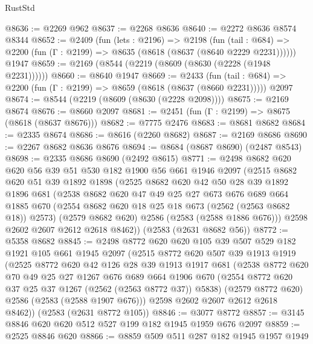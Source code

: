 \begin{lexlean}{RustStd}
\begin{coremodule}
{\begin{coremodule}
{{{{{{{{{{{{{{{@8636 := @2269 @962
@8637 := @2268 @8636
@8640 := @2272 @8636 @8574 @8344
@8652 := @2409
    (fun (lets : @2196) =>
    @2198
      (fun (tail : @684) => @2200 (fun (Γ : @2199) => @8635 (@8618 (@8637 (@8640 @2229 @2231))))))
    @1947
@8659 := @2169 (@8544 (@2219 (@8609 (@8630 (@2228 (@1948 @2231))))))
@8660 := @8640 @1947
@8669 := @2433
    (fun (tail : @684) => @2200 (fun (Γ : @2199) => @8659 (@8618 (@8637 (@8660 @2231)))))
    @2097
@8674 := @8544 (@2219 (@8609 (@8630 (@2228 @2098))))
@8675 := @2169 @8674
@8676 := @8660 @2097
@8681 := @2451 (fun (Γ : @2199) => @8675 (@8618 (@8637 @8676)))
@8682 := @7775 @2476
@8683 := @8681 @8682
@8684 := @2335 @8674
@8686 := @8616 (@2260 @8682)
@8687 := @2169 @8686
@8690 := @2267 @8682 @8636 @8676
@8694 := @8684 (@8687 @8690) (@2487 @8543)
@8698 := @2335 @8686 @8690 (@2492 @8615)
@8771 := @2498
    @8682
    @620
    @620
    @56
    @39
    @51
    @530
    @182
    @1900
    @56
    @661
    @1946
    @2097
    (@2515
      @8682
      @620
      @51
      @39
      @1892
      @1898
      (@2525
        @8682
        @620
        @42
        @50
        @28
        @39
        @1892
        @1896
        @681
        (@2538
          @8682
          @620
          @47
          @49
          @25
          @27
          @673
          @676
          @689
          @664
          @1885
          @670
          (@2554 @8682 @620 @18 @25 @18 @673 (@2562 (@2563 @8682 @18)) @2573)
          (@2579 @8682 @620)
          @2586
          (@2583 (@2588 @1886 @676)))
        @2598
        @2602
        @2607
        @2612
        @2618
        @8462))
    (@2583 (@2631 @8682 @56))
@8772 := @5358 @8682
@8845 := @2498
    @8772
    @620
    @620
    @105
    @39
    @507
    @529
    @182
    @1921
    @105
    @661
    @1945
    @2097
    (@2515
      @8772
      @620
      @507
      @39
      @1913
      @1919
      (@2525
        @8772
        @620
        @42
        @126
        @28
        @39
        @1913
        @1917
        @681
        (@2538
          @8772
          @620
          @70
          @49
          @25
          @27
          @1267
          @676
          @689
          @664
          @1906
          @670
          (@2554 @8772 @620 @37 @25 @37 @1267 (@2562 (@2563 @8772 @37)) @5838)
          (@2579 @8772 @620)
          @2586
          (@2583 (@2588 @1907 @676)))
        @2598
        @2602
        @2607
        @2612
        @2618
        @8462))
    (@2583 (@2631 @8772 @105))
@8846 := @3077 @8772
@8857 := @3145 @8846 @620 @620 @512 @527 @199 @182 @1945 @1959 @676 @2097
@8859 := @2525 @8846 @620
@8866 := @8859 @509 @511 @287 @182 @1945 @1957 @1949
}}}}}}}}}}}}}}}
\end{coremodule}}
\end{coremodule}
\end{lexlean}
